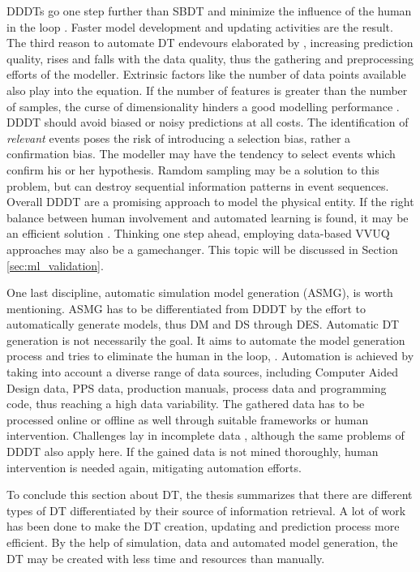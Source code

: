 DDDTs go one step further than SBDT and minimize the influence of the human in the loop \autocite{francis2021towards,Friederich2022}. Faster model development and updating activities are the result. The third reason to automate DT endevours elaborated by \citeauthor{schwede2024learning}, increasing prediction quality, rises and falls with the data quality, thus the gathering and preprocessing efforts of the modeller. Extrinsic factors like the number of data points available also play into the equation. If the number of features is greater than the number of samples, the curse of dimensionality hinders a good modelling performance \autocite{koppen2000curse}. DDDT should avoid biased or noisy predictions at all costs. The identification of \textit{relevant} events poses the risk of introducing a selection bias, rather a confirmation bias. The modeller may have the tendency to select events which confirm his or her hypothesis. Ramdom sampling may be a solution to this problem, but can destroy sequential information patterns in event sequences. Overall DDDT are a promising approach to model the physical entity. If the right balance between human involvement and automated learning is found, it may be an efficient solution \autocite{francis2021towards}. Thinking one step ahead, employing data-based VVUQ approaches may also be a gamechanger. This topic will be discussed in Section \autoref{sec:ml_validation}.

\label{par:asmg}
One last discipline, automatic simulation model generation (ASMG), is worth mentioning. ASMG has to be differentiated from DDDT by the effort to automatically generate models, thus DM and DS through DES. Automatic DT generation is not necessarily the goal. It aims to automate the model generation process and tries to eliminate the human in the loop, \autocite{reinhardt2019survey,lechevalier2018methodology}. Automation is achieved by taking into account a diverse range of data sources, including Computer Aided Design data, PPS data, production manuals, process data and programming code, thus reaching a high data variability. The gathered data has to be processed online or offline as well through suitable frameworks or human intervention. Challenges lay in incomplete data \autocite{bergmann2014automatische}, although the same problems of DDDT also apply here. If the gained data is not mined thoroughly, human intervention is needed again, mitigating automation efforts.

To conclude this section about DT, the thesis summarizes that there are different types of DT differentiated by their source of information retrieval. A lot of work has been done to make the DT creation, updating and prediction process more efficient. By the help of simulation, data and automated model generation, the DT may be created with less time and resources than manually.

